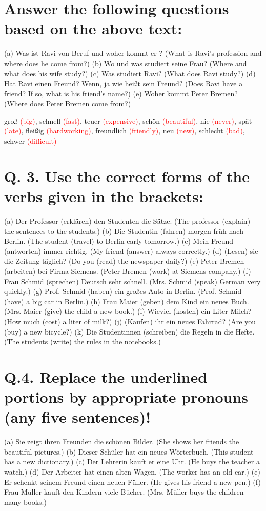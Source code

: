 \documentclass{article}
\begin{document}
\section*{Answer the following questions based on the above text:}
(a) Was ist Ravi von Beruf und woher kommt er ? (What is Ravi's profession and where does he come from?)
(b) Wo und was studiert seine Frau? (Where and what does his wife study?)
(c) Was studiert Ravi? (What does Ravi study?)
(d) Hat Ravi einen Freund? Wenn, ja wie heißt sein Freund? (Does Ravi have a friend? If so, what is his friend's name?)
(e) Woher kommt Peter Bremen? (Where does Peter Bremen come from?)

groß \textcolor{red}{(big)}, schnell \textcolor{red}{(fast)}, teuer \textcolor{red}{(expensive)}, schön \textcolor{red}{(beautiful)}, nie \textcolor{red}{(never)}, spät \textcolor{red}{(late)}, fleißig \textcolor{red}{(hardworking)}, freundlich \textcolor{red}{(friendly)}, neu \textcolor{red}{(new)}, schlecht \textcolor{red}{(bad)}, schwer \textcolor{red}{(difficult)}

\section*{Q. 3. Use the correct forms of the verbs given in the brackets:}
(a) Der Professor (erklären) den Studenten die Sätze. (The professor (explain) the sentences to the students.)
(b) Die Studentin (fahren) morgen früh nach Berlin. (The student (travel) to Berlin early tomorrow.)
(c) Mein Freund (antworten) immer richtig. (My friend (answer) always correctly.)
(d) (Lesen) sie die Zeitung täglich? (Do you (read) the newspaper daily?)
(e) Peter Bremen (arbeiten) bei Firma Siemens. (Peter Bremen (work) at Siemens company.)
(f) Frau Schmid (sprechen) Deutsch sehr schnell. (Mrs. Schmid (speak) German very quickly.)
(g) Prof. Schmid (haben) ein großes Auto in Berlin. (Prof. Schmid (have) a big car in Berlin.)
(h) Frau Maier (geben) dem Kind ein neues Buch. (Mrs. Maier (give) the child a new book.)
(i) Wieviel (kosten) ein Liter Milch? (How much (cost) a liter of milk?)
(j) (Kaufen) ihr ein neues Fahrrad? (Are you (buy) a new bicycle?)
(k) Die Studentinnen (schreiben) die Regeln in die Hefte. (The students (write) the rules in the notebooks.)

\section*{Q.4. Replace the underlined portions by appropriate pronouns (any five sentences)!}
(a) Sie zeigt ihren Freunden die schönen Bilder. (She shows her friends the beautiful pictures.)
(b) Dieser Schüler hat ein neues Wörterbuch. (This student has a new dictionary.)
(c) Der Lehrerin kauft er eine Uhr. (He buys the teacher a watch.)
(d) Der Arbeiter hat einen alten Wagen. (The worker has an old car.)
(e) Er schenkt seinem Freund einen neuen Füller. (He gives his friend a new pen.)
(f) Frau Müller kauft den Kindern viele Bücher. (Mrs. Müller buys the children many books.)
\end{document}
